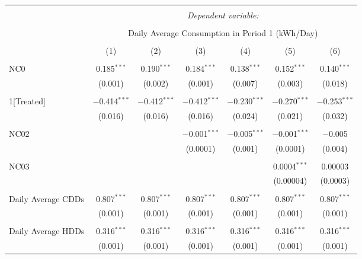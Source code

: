 
\begin{table}[!htbp] \centering 
  \caption{} 
  \label{} 
\small 
\begin{tabular}{@{\extracolsep{5pt}}lcccccc} 
\\[-1.8ex]\hline 
\hline \\[-1.8ex] 
 & \multicolumn{6}{c}{\textit{Dependent variable:}} \\ 
\cline{2-7} 
\\[-1.8ex] & \multicolumn{6}{c}{Daily Average Consumption in Period 1 (kWh/Day)} \\ 
\\[-1.8ex] & (1) & (2) & (3) & (4) & (5) & (6)\\ 
\hline \\[-1.8ex] 
 NC0 & 0.185$^{***}$ & 0.190$^{***}$ & 0.184$^{***}$ & 0.138$^{***}$ & 0.152$^{***}$ & 0.140$^{***}$ \\ 
  & (0.001) & (0.002) & (0.001) & (0.007) & (0.003) & (0.018) \\ 
  & & & & & & \\ 
 1[Treated] & $-$0.414$^{***}$ & $-$0.412$^{***}$ & $-$0.412$^{***}$ & $-$0.230$^{***}$ & $-$0.270$^{***}$ & $-$0.253$^{***}$ \\ 
  & (0.016) & (0.016) & (0.016) & (0.024) & (0.021) & (0.032) \\ 
  & & & & & & \\ 
 NC02 &  &  & $-$0.001$^{***}$ & $-$0.005$^{***}$ & $-$0.001$^{***}$ & $-$0.005 \\ 
  &  &  & (0.0001) & (0.001) & (0.0001) & (0.004) \\ 
  & & & & & & \\ 
 NC03 &  &  &  &  & 0.0004$^{***}$ & 0.00003 \\ 
  &  &  &  &  & (0.00004) & (0.0003) \\ 
  & & & & & & \\ 
 Daily Average CDDs & 0.807$^{***}$ & 0.807$^{***}$ & 0.807$^{***}$ & 0.807$^{***}$ & 0.807$^{***}$ & 0.807$^{***}$ \\ 
  & (0.001) & (0.001) & (0.001) & (0.001) & (0.001) & (0.001) \\ 
  & & & & & & \\ 
 Daily Average HDDs & 0.316$^{***}$ & 0.316$^{***}$ & 0.316$^{***}$ & 0.316$^{***}$ & 0.316$^{***}$ & 0.316$^{***}$ \\ 
  & (0.001) & (0.001) & (0.001) & (0.001) & (0.001) & (0.001) \\ 

\end{tabular}
\end{table}
